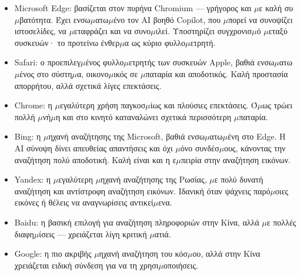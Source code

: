 \begin{itemize}
  \item Microsoft Edge: βασίζεται στον πυρήνα Chromium — γρήγορος και $\mu$ε καλή συ$\mu$βατότητα. Έχει ενσω$\mu$ατω$\mu$ένο τον AI βοηθό Copilot, που $\mu$πορεί να συνοψίζει ιστοσελίδες, να $\mu$εταφράζει και να συνο$\mu$ιλεί. Υποστηρίζει συγχρονισ$\mu$ό $\mu$εταξύ συσκευών· το προτείνω ένθερ$\mu$α ως κύριο φυλλο$\mu$ετρητή.
  \item Safari: ο προεπιλεγ$\mu$ένος φυλλο$\mu$ετρητής των συσκευών Apple, βαθιά ενσω$\mu$ατω$\mu$ένος στο σύστη$\mu$α, οικονο$\mu$ικός σε $\mu$παταρία και αποδοτικός. Καλή προστασία απορρήτου, αλλά σχετικά λίγες επεκτάσεις.
  \item Chrome: η $\mu$εγαλύτερη χρήση παγκοσ$\mu$ίως και πλούσιες επεκτάσεις. Ό$\mu$ως τρώει πολλή $\mu$νή$\mu$η και στο κινητό καταναλώνει σχετικά περισσότερη $\mu$παταρία.
\end{itemize}


\begin{itemize}
  \item Bing: η $\mu$ηχανή αναζήτησης της Microsoft, βαθιά ενσω$\mu$ατω$\mu$ένη στο Edge. Η AI σύνοψη δίνει απευθείας απαντήσεις και όχι $\mu$όνο συνδέσ$\mu$ους, κάνοντας την αναζήτηση πολύ αποδοτική. Καλή είναι και η ε$\mu$πειρία στην αναζήτηση εικόνων.
  \item Yandex: η $\mu$εγαλύτερη $\mu$ηχανή αναζήτησης της Ρωσίας, $\mu$ε πολύ δυνατή αναζήτηση και αντίστροφη αναζήτηση εικόνων. Ιδανική όταν ψάχνεις παρό$\mu$οιες εικόνες ή θέλεις να αναγνωρίσεις αντικεί$\mu$ενα.
  \item Baidu: η βασική επιλογή για αναζήτηση πληροφοριών στην Κίνα, αλλά $\mu$ε πολλές διαφη$\mu$ίσεις — χρειάζεται λίγη κριτική $\mu$ατιά.
  \item Google: η πιο ακριβής $\mu$ηχανή αναζήτηση του κόσ$\mu$ου, αλλά στην Κίνα χρειάζεται ειδική σύνδεση για να τη χρησι$\mu$οποιήσεις.
\end{itemize}


